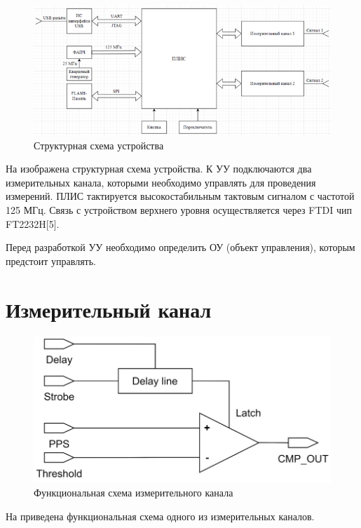 \begin{figure}[ht!] 
	\center
	\includegraphics {my_folder/images//scheme_struct}
	\caption{Структурная схема устройства} 
	\label{fig:scheme-struct}  
\end{figure}

На  изображена структурная схема устройства.
К УУ подключаются два измерительных канала, которыми необходимо управлять для проведения измерений.
ПЛИС тактируется высокостабильным тактовым сигналом с частотой 125 МГц. Связь с устройством верхнего уровня
осуществляется через FTDI чип FT2232H[5].

Перед разработкой УУ необходимо определить ОУ (объект управления), которым предстоит управлять.

\section{Измерительный канал}

\begin{figure}[ht!] 
	\center
	\includegraphics {my_folder/images//ch_func}
	\caption{Функциональная схема измерительного канала} 
	\label{fig:ch-func}  
\end{figure}

На  приведена функциональная схема одного из измерительных каналов.


